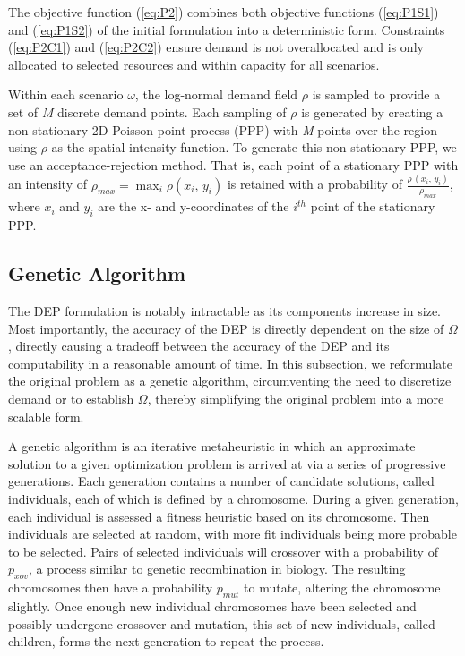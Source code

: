 \documentclass[onecolumn,draftcls]{IEEEtran}
\begin{document}
The objective function (\ref{eq:P2}) combines both objective functions (\ref{eq:P1S1}) and (\ref{eq:P1S2}) of the initial formulation into a deterministic form.  Constraints (\ref{eq:P2C1}) and (\ref{eq:P2C2})	ensure demand is not overallocated and is only allocated to selected resources and within capacity for all scenarios.

Within each scenario $\omega$, the log-normal demand field $\rho$ is sampled to provide a set of \textit{M} discrete demand points.  Each sampling of $\rho$ is generated by creating a non-stationary 2D Poisson point process (PPP) with \textit{M} points over the region using $\rho$ as the spatial intensity function.  To generate this non-stationary PPP, we use an acceptance-rejection method.  That is, each point of a stationary PPP with an intensity of $\rho_{max} = \max_i\rho\left(x_i,\, y_i\right)$ is retained with a probability of $\frac{\rho\,\left(x_i,\, y_i\right)}{\rho_{max}}$, where $x_i$ and $y_i$ are the x- and y-coordinates of the $i^{th}$ point of the stationary PPP.


\subsection{Genetic Algorithm}

The DEP formulation is notably intractable as its components increase in size.  Most importantly, the accuracy of the DEP is directly dependent on the size of $\Omega$, directly causing a tradeoff between the accuracy of the DEP and its computability in a reasonable amount of time.  In this subsection, we reformulate the original problem as a genetic algorithm, circumventing the need to discretize demand or to establish $\Omega$, thereby simplifying the original problem into a more scalable form.

A genetic algorithm is an iterative metaheuristic in which an approximate solution to a given optimization problem is arrived at via a series of progressive generations.  Each generation contains a number of candidate solutions, called individuals, each of which is defined by a chromosome.  During a given generation, each individual is assessed a fitness heuristic based on its chromosome.  Then individuals are selected at random, with more fit individuals being more probable to be selected.  Pairs of selected individuals will crossover with a probability of $p_{xov}$, a process similar to genetic recombination in biology.  The resulting chromosomes then have a probability $p_{mut}$ to mutate, altering the chromosome slightly.  Once enough new individual chromosomes have been selected and possibly undergone crossover and mutation, this set of new individuals, called children, forms the next generation to repeat the process.  %
\end{document}

